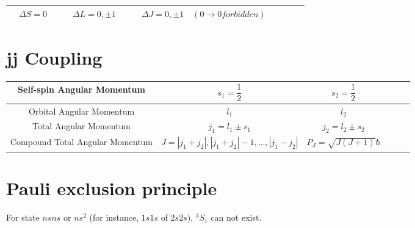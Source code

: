 \begin{table*}[h]
  \centering
  \begin{tabular}{|Sc|Sc|Sc|}
    \hline
    $\quad \Delta S = 0 \quad$ & $\quad \Delta L = 0, \pm 1 \quad$ & $\quad \Delta J = 0,\pm 1 \quad \left( 0 \rightarrow 0 forbidden \right) \quad$ \\
    \hline
  \end{tabular}
\end{table*}

\section{jj Coupling}

\begin{table*}[h]
  \centering
  \begin{tabular}{|Sc|Sc|Sc|}
    \hline
    Self-spin Angular Momentum & $s_1 = \dfrac{1}{2}  $ & $s_2 = \dfrac{1}{2} $  \\
    \hline
    Orbital Angular Momentum & $l_1$ & $l_2$  \\
    \hline
    Total Angular Momentum & $j_1 = l_1 \pm s_1$ & $j_2 = l_2 \pm s_2$  \\
    \hline
    Compound Total Angular Momentum & $J = | j_1 + j_2 |, | j_1 + j_2 | - 1, \dots , | j_1 - j_2 | $ & $P_J = \sqrt{J \left( J + 1 \right)} \hbar$  \\
    \hline
  \end{tabular}
\end{table*}

\section{Pauli exclusion principle}

For state $nsns$ or $ns^2$ (for instance, $1s1s$ of $2s2s$), ${}^3S_1$ can not exist. 

